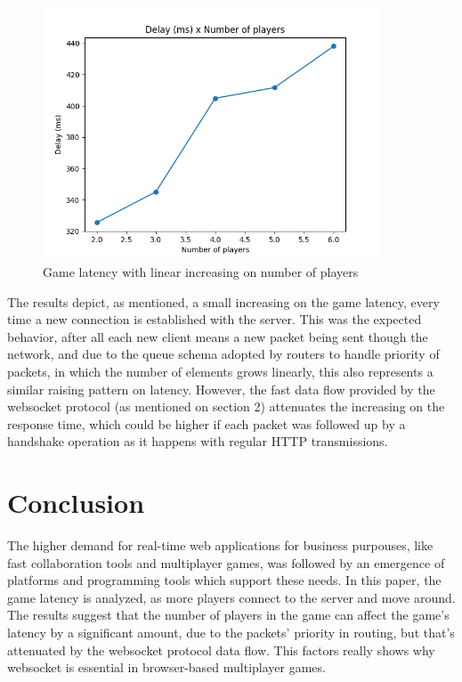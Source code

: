 \documentclass[english]{sbrt}
\begin{document}
\begin{figure}[H]
  \centering
  \includegraphics[width=10cm]{graphs/graph.png}
  \caption{Game latency with linear increasing on number of players}
  \label{latency}
\end{figure}

The results depict, as mentioned, a small increasing on the game latency, every time a new connection is established with the server. This was the expected behavior, after all each new client means a new packet being sent though the network, and due to the queue schema adopted by routers to handle priority of packets, in which the number of elements grows linearly, this also represents a similar raising pattern on latency. However, the fast data flow provided by the websocket protocol (as mentioned on section 2) attenuates the increasing on the response time, which could be higher if each packet was followed up by a handshake operation as it happens with regular HTTP transmissions.

\section{\textbf{Conclusion}}

The higher demand for real-time web applications for business purpouses, like fast collaboration tools and multiplayer games, was followed by an emergence of platforms and programming tools which support these needs. In this paper, the game latency is analyzed, as more players connect to the server and move around. The results suggest that the number of players in the game can affect the game's latency by a significant amount, due to the packets' priority in routing, but that's attenuated by the websocket protocol data flow. This factors really shows why websocket is essential in browser-based multiplayer games.

\cite{chen2011framework}



\end{document}
